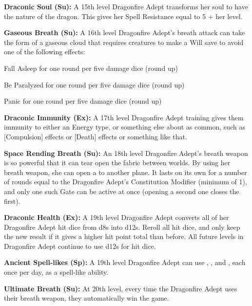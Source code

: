 \textbf{Draconic Soul (Su):} A 15th level Dragonfire Adept transforms her soul to have the nature of the dragon. This gives her Spell Resistance equal to 5 + her level.

\textbf{Gaseous Breath (Su):} A 16th level Dragonfire Adept's breath attack can take the form of a gaseous cloud that requires creatures to make a Will save to avoid one of the following effects:

\begin{itemize*}
\item Fall Asleep for one round per five damage dice (round up)
\item Be Paralyzed for one round per five damage dice (round up)
\item Panic for one round per five damage dice (round up)
\end{itemize*}

\textbf{Draconic Immunity (Ex):} A 17th level Dragonfire Adept training gives them immunity to either an Energy type, or something else about as common, such as [Compulsion] effects or [Death] effects or something like that.

\textbf{Space Rending Breath (Su):} An 18th level Dragonfire Adept's breath weapon is so powerful that it can tear open the fabric between worlds. By using her breath weapon, she can open a  to another plane. It lasts on its own for a number of rounds equal to the Dragonfire Adept's Constitution Modifier (minimum of 1), and only one such Gate can be active at once (opening a second one closes the first).

\textbf{Draconic Health (Ex):} A 19th level Dragonfire Adept converts all of her Dragonfire Adept hit dice from d8s into d12s. Reroll all hit dice, and only keep the new result if it gives a higher hit point total than before. All future levels in Dragonfire Adept continue to use d12s for hit dice.

\textbf{Ancient Spell-likes (Sp):} A 19th level Dragonfire Adept can use , , and , each once per day, as a spell-like ability.

\textbf{Ultimate Breath (Su):} At 20th level, every time the Dragonfire Adept uses their breath weapon, they automatically win the game.

